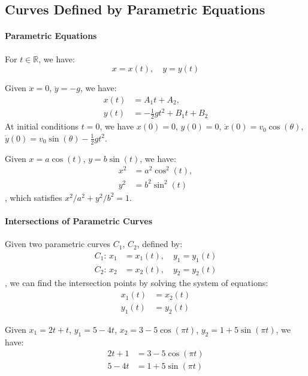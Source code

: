 \documentclass[11pt]{article}
\begin{document}
\subsection{Curves Defined by Parametric Equations}
\paragraph{Parametric Equations} For $t \in \mathbb{R}$, we have:
\begin{equation}
    x = x(t), \quad y = y(t)
\end{equation}
\begin{example}
    Given $\ddot{x} = 0$, $\ddot{y} = -g$, we have:
    \begin{align*}
        x(t) &= A_1 t + A_2, \\
        y(t) &= -\frac{1}{2}gt^2 + B_1 t + B_2
    \end{align*}
    At initial conditions $t = 0$, we have $x(0) = 0$, $y(0) = 0$, $\dot x(0) = v_0 \cos(\theta)$, $\dot y(0) = v_0 \sin(\theta) - \frac{1}{2}gt^2$.
\end{example}
\begin{example}[Ellipse]
    Given $x = a\cos(t)$, $y = b\sin(t)$, we have:
    \begin{align*}
        x^2 &= a^2\cos^2(t), \\
        y^2 &= b^2\sin^2(t)
    \end{align*}
    , which satisfies $x^2/a^2 + y^2/b^2 = 1$.
\end{example}
\paragraph{Intersections of Parametric Curves} Given two parametric curves $C_1,\,C_2$, defined by:
\begin{align*}
    C_1:\, x_1 &= x_1(t), \quad y_1 = y_1(t) \\
    C_2:\, x_2 &= x_2(t), \quad y_2 = y_2(t)
\end{align*}
, we can find the intersection points by solving the system of equations:
\begin{align*}
    x_1(t) &= x_2(t) \\
    y_1(t) &= y_2(t)
\end{align*}
\begin{example}
    Given $x_1 = 2t+t$, $y_1 = 5-4t$, $x_2 = 3 - 5\cos(\pi t)$, $y_2 = 1 + 5\sin(\pi t)$, we have:
    \begin{align*}
        2t + 1 &= 3 - 5\cos(\pi t) \\
        5 - 4t &= 1 + 5\sin(\pi t)
    \end{align*}
\end{example}
\end{document}
